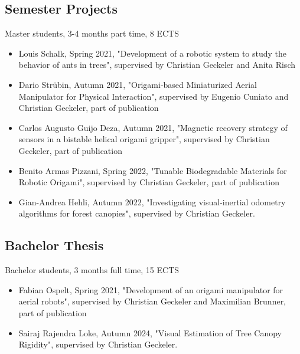 \subsection{Semester Projects}
Master students, 3-4 months part time, 8 ECTS
\begin{itemize}
    \item Louis Schalk, Spring 2021, "Development of a robotic system to study the behavior of ants in trees", supervised by Christian Geckeler and Anita Risch

    \item Dario Strübin, Autumn 2021, "Origami-based Miniaturized Aerial Manipulator for Physical Interaction", supervised by Eugenio Cuniato and Christian Geckeler, part of publication \cite{Cuniato2023}

    \item Carlos Augusto Guijo Deza, Autumn 2021, "Magnetic recovery strategy of sensors in a bistable helical origami gripper", supervised by Christian Geckeler, part of publication \cite{Geckeler2022a}

    \item Benito Armas Pizzani, Spring 2022, "Tunable Biodegradable Materials for Robotic Origami", supervised by Christian Geckeler, part of publication \cite{Geckeler2023b}

    \item Gian-Andrea Hehli, Autumn 2022, "Investigating visual-inertial odometry algorithms for forest canopies", supervised by Christian Geckeler.
\end{itemize}

\subsection{Bachelor Thesis}
Bachelor students, 3 months full time, 15 ECTS %

\begin{itemize}
  \item Fabian Ospelt, Spring 2021, "Development of an origami manipulator for aerial robots", supervised by Christian Geckeler and Maximilian Brunner, part of publication \cite{Cuniato2023}

  \item Sairaj Rajendra Loke, Autumn 2024, "Visual Estimation of Tree Canopy Rigidity", supervised by Christian Geckeler.
\end{itemize}




